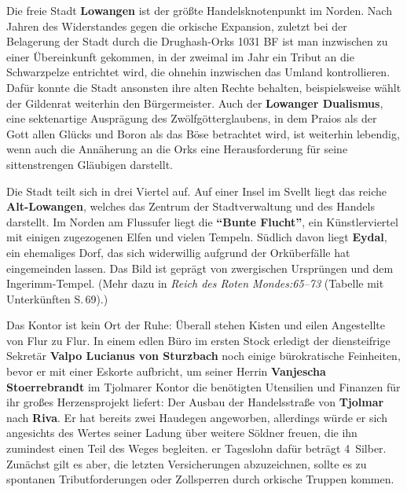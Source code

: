 Die freie Stadt \textbf{Lowangen} ist der größte Handelsknotenpunkt im Norden.
Nach Jahren des Widerstandes gegen die orkische Expansion, zuletzt bei der Belagerung der Stadt durch die Drughash-Orks 1031 BF ist man inzwischen zu einer Übereinkunft gekommen, in der zweimal im Jahr ein Tribut an die Schwarzpelze entrichtet wird, die ohnehin inzwischen das Umland kontrollieren.
Dafür konnte die Stadt ansonsten ihre alten Rechte behalten, beispielsweise wählt der Gildenrat weiterhin den Bürgermeister.
Auch der \textbf{Lowanger Dualismus}, eine sektenartige Ausprägung des Zwölfgötterglaubens, in dem Praios als der Gott allen Glücks und Boron als das Böse betrachtet wird, ist weiterhin lebendig, wenn auch die Annäherung an die Orks eine Herausforderung für seine sittenstrengen Gläubigen darstellt.


Die Stadt teilt sich in drei Viertel auf. Auf einer Insel im Svellt liegt das reiche \textbf{Alt-Lowangen}, welches das Zentrum der Stadtverwaltung und des Handels darstellt. Im Norden am Flussufer liegt die \textbf{\enquote{Bunte Flucht}}, ein Künstlerviertel mit einigen zugezogenen Elfen und vielen Tempeln.
Südlich davon liegt \textbf{Eydal}, ein ehemaliges Dorf, das sich widerwillig aufgrund der Orküberfälle hat eingemeinden lassen.
Das Bild ist geprägt von zwergischen Ursprüngen und dem Ingerimm-Tempel.
(Mehr dazu in \emph{Reich des Roten Mondes:65--73} (Tabelle mit Unterkünften S.\,69).)


Das Kontor ist kein Ort der Ruhe:
Überall stehen Kisten und eilen Angestellte von Flur zu Flur. In einem edlen Büro im ersten Stock erledigt der diensteifrige Sekretär \textbf{Valpo Lucianus von Sturzbach} noch einige bürokratische Feinheiten, bevor er mit einer Eskorte aufbricht,
	um seiner Herrin \textbf{Vanjescha Stoerrebrandt} im Tjolmarer Kontor die benötigten Utensilien und Finanzen für ihr großes Herzensprojekt liefert:
	Der Ausbau der Handelsstraße von \textbf{Tjolmar} nach \textbf{Riva}.
	Er hat bereits zwei Haudegen angeworben, allerdings würde er sich angesichts des Wertes seiner Ladung über weitere Söldner freuen, die ihn zumindest einen Teil des Weges begleiten. 
	er Tageslohn dafür beträgt 4~Silber. Zunächst gilt es aber, die letzten Versicherungen abzuzeichnen, sollte es zu spontanen Tributforderungen oder Zollsperren durch orkische Truppen kommen.


